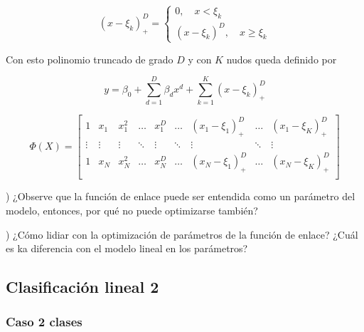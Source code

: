\begin{itemize}
    \begin{equation}
        (x-\xi_k)_+^D = \left\{\begin{matrix}
        0,\quad x < \xi_k\\
        (x-\xi_k)^D,\quad x \geq \xi_k
        \end{matrix}\right.
    \end{equation}
    
    Con esto polinomio truncado de grado $D$ y con $K$ nudos queda definido por
    
    \begin{equation}
        y = \beta_0 + \sum_{d=1}^D\beta_dx^d+\sum_{k=1}^K(x-\xi_k)_+^D
    \end{equation}
    
    \begin{equation}
        \Phi(X) = \left[ \begin{matrix} 1 & x_1 & x_1^2 & \ldots & x_1^D & \ldots & (x_1-\xi_1)_+^D & \ldots & (x_1-\xi_K)_+^D \\
        \vdots & \vdots & \vdots & \ddots & \vdots & \ddots & \vdots & \ddots & \vdots\\
        1 & x_N & x_N^2 & \ldots & x_N^D & \ldots & (x_N-\xi_1)_+^D & \ldots & (x_N-\xi_K)_+^D \\
        \end{matrix} \right]
    \end{equation}
    
\end{itemize}




\begin{mdframed}[style=discusion, frametitle={\center Observaciones}]

) ¿Observe que la función de enlace puede ser entendida como un parámetro del modelo, entonces, por qué no puede optimizarse también?

) ¿Cómo lidiar con la optimización de parámetros de la función de enlace? ¿Cuál es ka diferencia con el modelo lineal en los parámetros?

\end{mdframed}




\subsection{Clasificación lineal 2}


\subsubsection{Caso 2 clases}

